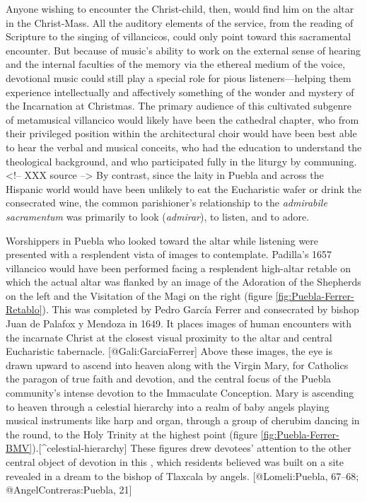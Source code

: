 Anyone wishing to encounter the Christ-child, then, would find him on the altar
in the Christ-Mass.
All the auditory elements of the service, from the reading of Scripture to the
singing of villancicos, could only point toward this sacramental encounter.
But because of music's ability to work on the external sense of hearing and the
internal faculties of the memory via the ethereal medium of the voice,
devotional music could still play a special role for pious listeners---helping
them experience intellectually and affectively something of the wonder and
mystery of the Incarnation at Christmas.
The primary audience of this cultivated subgenre of metamusical villancico would
likely have been the cathedral chapter, who from their privileged position
within the architectural choir would have been best able to hear the verbal and
musical conceits, who had the education to understand the theological
background, and who participated fully in the liturgy by communing.
<!-- XXX  source -->
By contrast, since the laity in Puebla and across the Hispanic world would have
been unlikely to eat the Eucharistic wafer or drink the consecrated wine, the
common parishioner's relationship to the \emph{admirabile sacramentum} was primarily
to look (\emph{admirar}), to listen, and to adore.

Worshippers in Puebla who looked toward the altar while listening were presented
with a resplendent vista of images to contemplate.
Padilla's 1657 villancico would have been performed facing a resplendent
high-altar retable on which the actual altar was flanked by an image of the
Adoration of the Shepherds on the left and the Visitation of the Magi on the
right (figure \ref{fig:Puebla-Ferrer-Retablo}).
This  was completed by Pedro García Ferrer and consecrated
by bishop Juan de Palafox y Mendoza in 1649.
It places images of human encounters with the incarnate Christ at the closest
visual proximity to the altar and central Eucharistic tabernacle.
[@Gali:GarciaFerrer]
Above these images, the eye is drawn upward to ascend into heaven along with
the Virgin Mary, for Catholics the paragon of true faith and devotion, and the
central focus of the Puebla community's intense devotion to the Immaculate
Conception.
Mary is ascending to heaven through a celestial hierarchy  into a realm
of baby angels playing musical instruments like harp and organ, through a
group of cherubim dancing in the round, to the Holy Trinity at the highest
point (figure \ref{fig:Puebla-Ferrer-BMV}).[^celestial-hierarchy]
These figures drew devotees' attention to the other central object of devotion
in this , which residents believed was built on a site
revealed in a dream to the bishop of Tlaxcala by angels.
[@Lomeli:Puebla, 67--68; @AngelContreras:Puebla, 21]

